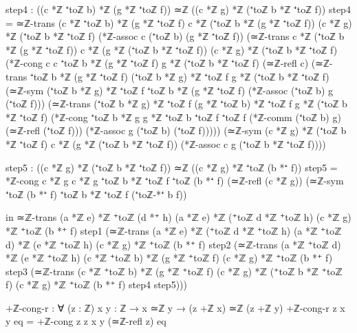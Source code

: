 \documentclass[11pt,a4paper]{book}
\begin{document}
\begin{code}
    step4 : ((c *ℤ ⁺toℤ b) *ℤ (g *ℤ ⁺toℤ f)) ≃ℤ ((c *ℤ g) *ℤ (⁺toℤ b *ℤ ⁺toℤ f))
    step4 = ≃ℤ-trans {(c *ℤ ⁺toℤ b) *ℤ (g *ℤ ⁺toℤ f)} 
                     {c *ℤ (⁺toℤ b *ℤ (g *ℤ ⁺toℤ f))} 
                     {(c *ℤ g) *ℤ (⁺toℤ b *ℤ ⁺toℤ f)}
            (*ℤ-assoc c (⁺toℤ b) (g *ℤ ⁺toℤ f))
            (≃ℤ-trans {c *ℤ (⁺toℤ b *ℤ (g *ℤ ⁺toℤ f))} 
                      {c *ℤ (g *ℤ (⁺toℤ b *ℤ ⁺toℤ f))} 
                      {(c *ℤ g) *ℤ (⁺toℤ b *ℤ ⁺toℤ f)}
             (*ℤ-cong {c} {c} {⁺toℤ b *ℤ (g *ℤ ⁺toℤ f)} {g *ℤ (⁺toℤ b *ℤ ⁺toℤ f)} 
                      (≃ℤ-refl c) 
                      (≃ℤ-trans {⁺toℤ b *ℤ (g *ℤ ⁺toℤ f)} 
                                {(⁺toℤ b *ℤ g) *ℤ ⁺toℤ f} 
                                {g *ℤ (⁺toℤ b *ℤ ⁺toℤ f)}
                       (≃ℤ-sym {(⁺toℤ b *ℤ g) *ℤ ⁺toℤ f} {⁺toℤ b *ℤ (g *ℤ ⁺toℤ f)} 
                               (*ℤ-assoc (⁺toℤ b) g (⁺toℤ f)))
                       (≃ℤ-trans {(⁺toℤ b *ℤ g) *ℤ ⁺toℤ f} 
                                 {(g *ℤ ⁺toℤ b) *ℤ ⁺toℤ f} 
                                 {g *ℤ (⁺toℤ b *ℤ ⁺toℤ f)}
                        (*ℤ-cong {⁺toℤ b *ℤ g} {g *ℤ ⁺toℤ b} {⁺toℤ f} {⁺toℤ f} 
                                 (*ℤ-comm (⁺toℤ b) g) (≃ℤ-refl (⁺toℤ f)))
                        (*ℤ-assoc g (⁺toℤ b) (⁺toℤ f)))))
             (≃ℤ-sym {(c *ℤ g) *ℤ (⁺toℤ b *ℤ ⁺toℤ f)} {c *ℤ (g *ℤ (⁺toℤ b *ℤ ⁺toℤ f))} 
                     (*ℤ-assoc c g (⁺toℤ b *ℤ ⁺toℤ f))))
    
    step5 : ((c *ℤ g) *ℤ (⁺toℤ b *ℤ ⁺toℤ f)) ≃ℤ ((c *ℤ g) *ℤ ⁺toℤ (b *⁺ f))
    step5 = *ℤ-cong {c *ℤ g} {c *ℤ g} {⁺toℤ b *ℤ ⁺toℤ f} {⁺toℤ (b *⁺ f)}
                    (≃ℤ-refl (c *ℤ g)) (≃ℤ-sym {⁺toℤ (b *⁺ f)} {⁺toℤ b *ℤ ⁺toℤ f} (⁺toℤ-*⁺ b f))
    
  in ≃ℤ-trans {(a *ℤ e) *ℤ ⁺toℤ (d *⁺ h)} {(a *ℤ e) *ℤ (⁺toℤ d *ℤ ⁺toℤ h)} {(c *ℤ g) *ℤ ⁺toℤ (b *⁺ f)}
       step1 (≃ℤ-trans {(a *ℤ e) *ℤ (⁺toℤ d *ℤ ⁺toℤ h)} {(a *ℤ ⁺toℤ d) *ℤ (e *ℤ ⁺toℤ h)} {(c *ℤ g) *ℤ ⁺toℤ (b *⁺ f)}
              step2 (≃ℤ-trans {(a *ℤ ⁺toℤ d) *ℤ (e *ℤ ⁺toℤ h)} {(c *ℤ ⁺toℤ b) *ℤ (g *ℤ ⁺toℤ f)} {(c *ℤ g) *ℤ ⁺toℤ (b *⁺ f)}
                     step3 (≃ℤ-trans {(c *ℤ ⁺toℤ b) *ℤ (g *ℤ ⁺toℤ f)} {(c *ℤ g) *ℤ (⁺toℤ b *ℤ ⁺toℤ f)} {(c *ℤ g) *ℤ ⁺toℤ (b *⁺ f)}
                            step4 step5)))
\end{code}

\begin{code}
+ℤ-cong-r : ∀ (z : ℤ) {x y : ℤ} → x ≃ℤ y → (z +ℤ x) ≃ℤ (z +ℤ y)
+ℤ-cong-r z {x} {y} eq = +ℤ-cong {z} {z} {x} {y} (≃ℤ-refl z) eq
\end{code}
\end{document}

